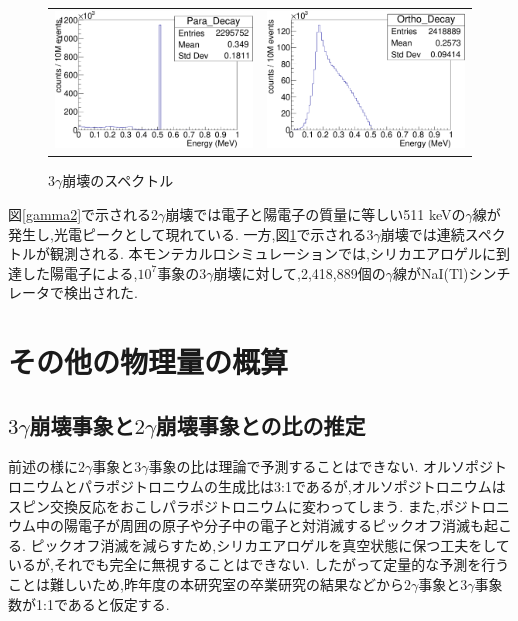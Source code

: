 \begin{figure}[!tbp]
	\begin{tabular}{cc}

	\centering
		\begin{minipage}{0.5\hsize}
		\includegraphics[width=7cm]{fig/gamma2.pdf}
	\caption{$2\gamma$崩壊のスペクトル}
	\label{gamma2}
		\end{minipage}&

		\begin{minipage}{0.5\hsize}
	\centering
		\includegraphics[width=7cm]{fig/gamma3.pdf}
	\caption{$3\gamma$崩壊のスペクトル}
	\label{gamma3}
		\end{minipage}

		\end{tabular}
\end{figure}

図\ref{gamma2}で示される2$\gamma$崩壊では電子と陽電子の質量に等しい511 keVの$\gamma$線が発生し,光電ピークとして現れている.
一方,図\ref{gamma3}で示される$3\gamma$崩壊では連続スペクトルが観測される.
本モンテカルロシミュレーションでは,シリカエアロゲルに到達した陽電子による,$10^7$事象の$3\gamma$崩壊に対して,2,418,889個の$\gamma$線がNaI(Tl)シンチレータで検出された.



\section{その他の物理量の概算}
\label{section_other}

\subsection{$3\gamma$崩壊事象と$2\gamma$崩壊事象との比の推定}
前述の様に$2\gamma$事象と$3\gamma$事象の比は理論で予測することはできない.
オルソポジトロニウムとパラポジトロニウムの生成比は3:1であるが,オルソポジトロニウムはスピン交換反応をおこしパラポジトロニウムに変わってしまう.
また,ポジトロニウム中の陽電子が周囲の原子や分子中の電子と対消滅するピックオフ消滅も起こる.
ピックオフ消滅を減らすため,シリカエアロゲルを真空状態に保つ工夫をしているが,それでも完全に無視することはできない.
したがって定量的な予測を行うことは難しいため,昨年度の本研究室の卒業研究の結果\cite{卒業論文2015}などから$2\gamma$事象と$3\gamma$事象数が1:1であると仮定する.


